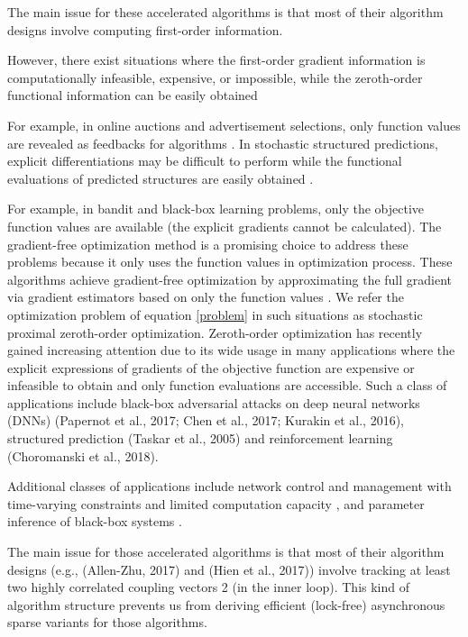 \documentclass{article}
\theoremstyle{definition}
\theoremstyle{remark}
\begin{document}
{\color{DarkOrchid}
The main issue for these accelerated algorithms is that most of their algorithm designs involve computing first-order information. 
}
{\color{Green}
{\color{RubineRed}
However, there exist situations where the first-order gradient information is computationally infeasible, expensive, or impossible,
while the zeroth-order functional information can be easily obtained
}

{\color{RubineRed}
 For example, in online auctions and advertisement
selections, only function values are revealed as feedbacks for algorithms \cite{wibisono2012finite}. In stochastic structured predictions, explicit differentiations may be difficult to perform while the functional evaluations of predicted structures are easily obtained \cite{sokolov2016stochastic}. }

For example, in bandit \cite{shamir2017optimal} and black-box learning \cite{chen2017zoo} problems, only the objective function values are available (the explicit gradients cannot be calculated). 
The gradient-free  optimization method \cite{nesterov2017random} is a promising choice to address these problems because it only uses the function values in optimization process. {\color{Brown} These algorithms achieve gradient-free optimization by approximating the full gradient via gradient estimators based on only the function values \cite{brent2013algorithms,spall2005introduction}.} 
{\color{RubineRed} We refer the optimization problem of equation \eqref{problem} in such situations as stochastic proximal zeroth-order optimization.}
{\color{YellowOrange}
Zeroth-order optimization has recently gained increasing
attention due to its wide usage in many applications where
the explicit expressions of gradients of the objective function are expensive or infeasible to obtain and only function
evaluations are accessible. Such a class of applications include black-box adversarial attacks on deep neural networks
(DNNs) (Papernot et al., 2017; Chen et al., 2017; Kurakin
et al., 2016), structured prediction (Taskar et al., 2005) and
reinforcement learning (Choromanski et al., 2018).
}
}
{\color{Brown}
Additional classes of applications include network control and management with time-varying constraints and limited computation capacity \cite{chen2019bandit,liu2017zeroth}, and parameter inference of black-box systems \cite{fu2002optimization,lian2016comprehensive}. 
}

{\color{DarkOrchid}
The main issue for those accelerated algorithms is that most of their algorithm designs (e.g., (Allen-Zhu, 2017)
and (Hien et al., 2017)) involve tracking at least two highly
correlated coupling vectors 2 (in the inner loop). This kind
of algorithm structure prevents us from deriving efficient
(lock-free) asynchronous sparse variants for those algorithms.
}
\end{document}
